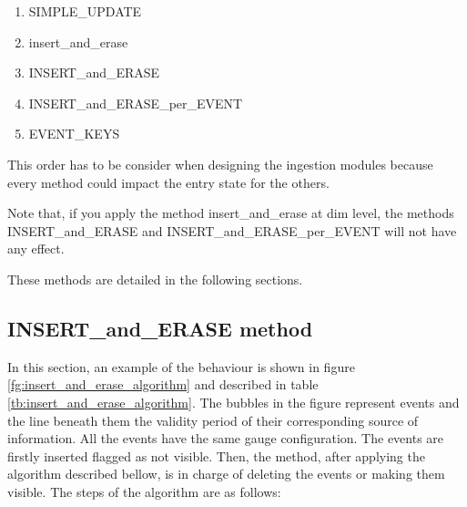 \begin{enumerate}
\item SIMPLE\_UPDATE
\item insert\_and\_erase
\item INSERT\_and\_ERASE
\item INSERT\_and\_ERASE\_per\_EVENT
\item EVENT\_KEYS
\end{enumerate}

This order has to be consider when designing the ingestion modules because every method could impact the entry state for the others.

Note that, if you apply the method insert\_and\_erase at \acrshort{dim} level, the methods INSERT\_and\_ERASE and INSERT\_and\_ERASE\_per\_EVENT will not have any effect.

These methods are detailed in the following sections.

\subsection {INSERT\_and\_ERASE method}

In this section, an example of the behaviour is shown in figure \ref{fg:insert_and_erase_algorithm} and described in table \ref{tb:insert_and_erase_algorithm}. The bubbles in the figure represent events and the line beneath them the validity period of their corresponding source of information. All the events have the same gauge configuration.
The events are firstly inserted flagged as not visible. Then, the method, after applying the algorithm described bellow, is in charge of deleting the events or making them visible.
The steps of the algorithm are as follows:

